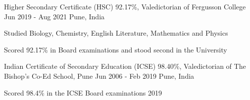 \resumeExp
{Higher Secondary Certificate (HSC)}
{92.17\%, Valedictorian of Fergusson College}
{Jun 2019 - Aug 2021}
{Pune, India}

\resumeItemListStart
        \item[$\bullet$] {Studied Biology, Chemistry, English Literature, Mathematics and Physics}
	    \item[$\bullet$] {Scored 92.17\% in  Board examinations and stood second in the University}
\resumeItemListEnd

\resumeExp
{Indian Certificate of Secondary Education (ICSE)}
{98.40\%, Valedictorian of The Bishop's Co-Ed School, Pune}
{Jun 2006 - Feb 2019}
{Pune, India}

\resumeItemListStart
        \item[$\bullet$] {Scored 98.4\% in the ICSE Board examinations 2019}
\resumeItemListEnd


\resumeSubHeadingListEnd
\vspace{-5.5mm}